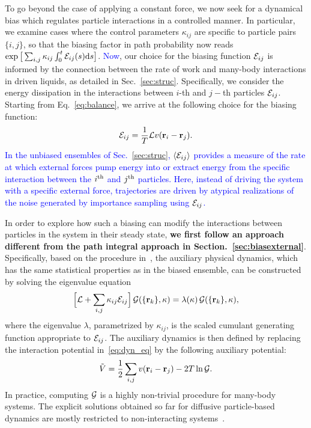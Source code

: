 \documentclass[superscriptaddress, twocolumn, prx, longbibliography, nofootinbib]{revtex4-1}
\newcommand{\tn}[1]{{\color{red}#1}}
\begin{document}
To go beyond the case of applying a constant force, we now seek for a dynamical bias which regulates particle interactions in a controlled manner. In particular, we examine cases where the control parameters $\kappa_{ij}$ are specific to particle pairs $\{i,j\}$, so that the biasing factor in path probability now reads $\exp\big[\sum_{i,j}\kappa_{ij}\int_0^t{\cal E}_{ij}(s){\rm d}s\big]$. \textcolor{blue}{Now}, our choice for the biasing function ${\cal E}_{ij}$ is informed by the connection between the rate of work and many-body interactions in driven liquids, as detailed in Sec.~\ref{sec:struc}. 
\tn{Specifically, we consider the energy dissipation in the interactions between $i$-th and $j-$th particles ${\cal E}_{ij}$. Starting from Eq.~\ref{eq:balance}, we arrive at the following choice for the biasing function:}
\begin{equation}\label{eq:eps_bis}
	{\cal E}_{ij} = \frac{1}{T} {\cal L} v({\bf r}_i-{\bf r}_j) .
\end{equation}
\textcolor{blue}{In the unbiased ensembles of Sec.~\ref{sec:struc}, $\langle {\cal E}_{ij} \rangle$ provides a measure of the rate at which external forces pump energy into or extract energy from the specific interaction between the $i^{\rm th}$ and $j^{\rm th}$ particles. Here, instead of driving the system with a specific external force, trajectories are driven by atypical realizations of the noise generated by importance sampling using ${\cal E}_{ij}$.}



In order to explore how such a biasing can modify the interactions between particles in the system in their steady state, {\bf{we first follow an approach different from the path integral approach in Section.~\ref{sec:biasexternal}}}. Specifically, based on the procedure in~\cite{Jack2010,Chetrite2013}, the auxiliary physical dynamics, which has the same statistical properties as in the biased ensemble, can be constructed by solving the eigenvalue equation 
\begin{equation}\label{eq:adjointbiased}
	\Big[ {\cal L} + \sum_{i,j}\kappa_{ij}{\cal E}_{ij} \Big]\,{\cal G}(\{{\bf r}_k\},\kappa) = \lambda(\kappa)\,{\cal G}(\{{\bf r}_k\},\kappa) ,
\end{equation}
where the eigenvalue $\lambda$, parametrized by $\kappa_{ij}$, is the scaled cumulant generating function appropriate to ${\cal E}_{ij}$. The auxiliary dynamics is then defined by replacing the interaction potential in~\eqref{eq:dyn_eq} by the following auxiliary potential:
\begin{equation} \label{eq:auxiliary}
	\tilde V = \frac{1}{2}\sum_{i,j} v({\bf r}_i-{\bf r}_j) - 2 T \ln{\cal G} .
\end{equation}
In practice, computing $\cal G$ is a highly non-trivial procedure for many-body systems. The explicit solutions obtained so far for diffusive particle-based dynamics are mostly restricted to non-interacting systems~\cite{Chetrite2013, Touchette2016}.
\end{document}
